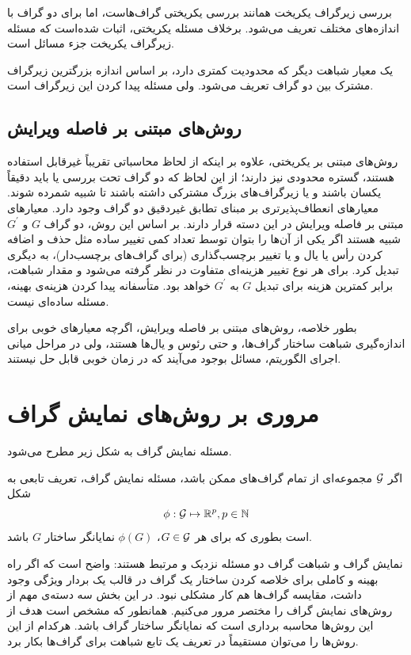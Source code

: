 بررسی زیرگراف یکریخت همانند بررسی یکریختی گراف‌هاست، اما برای دو گراف با اندازه‌های مختلف تعریف می‌شود. برخلاف مسئله یکریختی، اثبات شده‌است که مسئله زیرگراف یکریخت جزء مسائل  است.

یک معیار شباهت دیگر که محدودیت کمتری دارد، بر اساس اندازه بزرگترین زیرگراف مشترک بین دو گراف تعریف می‌شود. ولی مسئله پیدا کردن این زیرگراف  است.

\subsection{روش‌های مبتنی بر فاصله ویرایش}
روش‌های مبتنی بر یکریختی، علاوه بر اینکه از لحاظ محاسباتی تقریباً غیرقابل استفاده هستند، گستره محدودی نیز دارند؛ از این لحاظ که دو گراف تحت بررسی یا باید دقیقاً یکسان باشند و یا زیرگراف‌های بزرگ مشترکی داشته باشند تا شبیه شمرده شوند. معیارهای انعطاف‌پذیرتری بر مبنای تطابق غیردقیق دو گراف وجود دارد. معیارهای مبتنی بر فاصله ویرایش در این دسته قرار دارند. بر اساس این روش، دو گراف $G$ و $G^\prime$ شبیه هستند اگر یکی از آن‌ها را بتوان توسط تعداد کمی تغییر ساده مثل حذف و اضافه کردن رأس یا یال و یا تغییر برچسب‌گذاری (برای گراف‌های برچسب‌دار)، به دیگری تبدیل کرد. برای هر نوع تغییر هزینه‌‌ای متفاوت در نظر گرفته می‌شود و مقدار شباهت، برابر کمترین هزینه برای تبدیل $G$ به $G^\prime$ خواهد بود. متأسفانه پیدا کردن هزینه‌ی بهینه، مسئله ساده‌ای نیست.

بطور خلاصه، روش‌های مبتنی بر فاصله ویرایش، اگرچه معیارهای خوبی برای اندازه‌گیری شباهت ساختار گراف‌ها، و حتی رئوس و یال‌ها هستند، ولی در مراحل میانی اجرای الگوریتم، مسائل  بوجود می‌آیند که در زمان خوبی قابل حل نیستند.

\section{مروری بر روش‌های نمایش گراف}\label{sec:graph_representation}
مسئله نمایش گراف به شکل زیر مطرح می‌شود.
\begin{definition}
اگر $\mathcal{G}$ مجموعه‌ای از تمام گراف‌های ممکن باشد، مسئله نمایش گراف‌، تعریف تابعی به شکل
\begin{equation*}
\phi:\mathcal{G} \mapsto \mathbb{R}^p, p \in \mathbb{N}
\end{equation*}
است بطوری که برای هر $G \in \mathcal{G}$،
 $\phi(G)$
  نمایانگر ساختار $G$ باشد.
\end{definition}

نمایش گراف و شباهت گراف دو مسئله نزدیک و مرتبط هستند: واضح است که اگر راه بهینه و کاملی برای خلاصه کردن ساختار یک گراف در قالب یک بردار ویژگی وجود داشت، مقایسه گراف‌ها هم کار مشکلی نبود. در این بخش سه دسته‌ی مهم از روش‌های نمایش گراف را مختصر مرور می‌کنیم. همانطور که مشخص است هدف از این روش‌ها محاسبه برداری است که نمایانگر ساختار گراف باشد. هرکدام از این روش‌ها را می‌توان مستقیماً در تعریف یک تابع شباهت برای گراف‌ها بکار برد.

